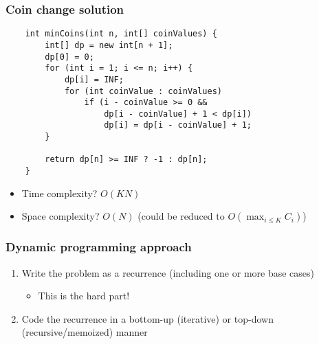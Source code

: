\documentclass[t]{beamer}
\begin{document}
\begin{frame}[fragile]

    \frametitle{Coin change solution}
    
    \begin{verbatim}
    int minCoins(int n, int[] coinValues) {
        int[] dp = new int[n + 1];
        dp[0] = 0;
        for (int i = 1; i <= n; i++) {
            dp[i] = INF;
            for (int coinValue : coinValues)
                if (i - coinValue >= 0 &&
                    dp[i - coinValue] + 1 < dp[i])
                    dp[i] = dp[i - coinValue] + 1;
        }

        return dp[n] >= INF ? -1 : dp[n];
    }
    \end{verbatim}

    \pause

    \begin{itemize}

        \item

        Time complexity? \pause $O(KN)$ \pause

        \item

        Space complexity? \pause $O(N)$ \pause (could be reduced to $O(\max_{i \leq K} C_i)$)

    \end{itemize}

\end{frame}

\begin{frame}

    \frametitle{Dynamic programming approach}

    \begin{enumerate}

        \item

        Write the problem as a recurrence (including one or more base cases)

        \pause

        \begin{itemize}

            \item

            This is the hard part!

        \end{itemize}

        \pause

        \item

        Code the recurrence in a bottom-up (iterative) or top-down (recursive/memoized) manner

    \end{enumerate}

\end{frame}
\end{document}
